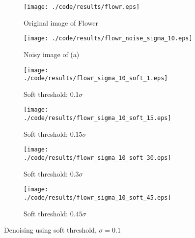 \documentclass[journal,comsoc]{IEEEtran}
\begin{document}
\begin{figure}[!hbt]
  \centering
  \begin{subfigure}{.25\textwidth}
    \centering
    \texttt{[image: ./code/results/flowr.eps]}
    \caption{Original image of Flower}
    \label{subfig:original-image-of-flower}
  \end{subfigure}%
  \begin{subfigure}{.25\textwidth}
    \centering
    \texttt{[image: ./code/results/flowr\_noise\_sigma\_10.eps]}
    \caption{Noisy image of (a)}
    \label{subfig:sigma-10-noisy-image-of-a}
  \end{subfigure}

  \begin{subfigure}{0.25\textwidth}
    \centering{}
    \texttt{[image: ./code/results/flowr\_sigma\_10\_soft\_1.eps]}
    \caption{Soft threshold: $0.1\sigma$}
  \end{subfigure}%
  \begin{subfigure}{.25\textwidth}
    \centering{}
    \texttt{[image: ./code/results/flowr\_sigma\_10\_soft\_15.eps]}
    \caption{Soft threshold: $0.15\sigma$}
  \end{subfigure}

  \begin{subfigure}{0.25\textwidth}
    \centering{}
    \texttt{[image: ./code/results/flowr\_sigma\_10\_soft\_30.eps]}
    \caption{Soft threshold: $0.3\sigma$}
  \end{subfigure}%
  \begin{subfigure}{.25\textwidth}
    \centering{}
    \texttt{[image: ./code/results/flowr\_sigma\_10\_soft\_45.eps]}
    \caption{Soft threshold: $0.45\sigma$}
  \end{subfigure}
  
  \caption{Denoising using soft threshold, $\sigma=0.1$}
  \label{fig:flower-sigma-10-soft-threshold}
\end{figure}
\end{document}
